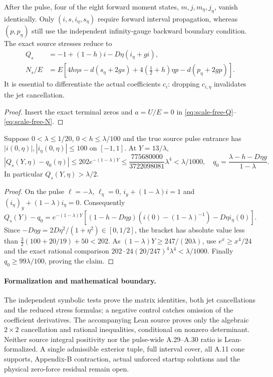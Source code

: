 \begin{corollary}
\label{cor:postpulse-six-state}
After the pulse, four of the eight forward moment states,
$m,j,m_\eta,j_\eta$, vanish identically. Only
$(i,s,i_\eta,s_\eta)$ require forward interval propagation,
whereas $(p,p_\eta)$ still use the independent infinity-gauge
backward boundary condition. The exact source stresses reduce to
\begin{align}
 Q_s&=-1+(1-h)i-D\eta(i_\eta+gi),\label{eq:pulse-end-Q-reduced}\\
 N_s/E&=E[4h\eta s-d(s_\eta+2gs)+
       4(\tfrac12+h)\eta p-d(p_\eta+2gp)].
 \label{eq:pulse-end-N-reduced}
\end{align}
It is essential to differentiate the actual coefficients $c_i$:
dropping $c_{i,\eta}$ invalidates the jet cancellation.
\end{corollary}
\begin{proof}
Insert the exact terminal zeros and $a=U/E=0$
in \eqref{eq:scale-free-Q}--\eqref{eq:scale-free-N}.
\end{proof}

\begin{proposition}
\label{prop:pulse-end-Q-positive}
Suppose $0<\lambda\le1/20$, $0<h\le\lambda/100$ and the
true source pulse entrance has
$|i(0,\eta)|,|i_\eta(0,\eta)|\le100$ on $[-1,1]$.
At $Y=13/\lambda$,
\[
 |Q_s(Y,\eta)-q_0(\eta)|
 \le202e^{-(1-\lambda)Y}
 \le\frac{775680000}{3722098081}\lambda^4
 <\lambda/1000,\quad
 q_0=\frac{\lambda-h-D\eta g}{1-\lambda}.
\]
In particular $Q_s(Y,\eta)>\lambda/2$.
\end{proposition}
\begin{proof}
On the pulse $\ell=-\lambda$, $\ell_\eta=0$,
$i_y+(1-\lambda)i=1$ and
$(i_\eta)_y+(1-\lambda)i_\eta=0$. Consequently
\[
 Q_s(Y)-q_0=e^{-(1-\lambda)Y}
 [(1-h-D\eta g)(i(0)-(1-\lambda)^{-1})
          -D\eta i_\eta(0)].
\]
Since $-D\eta g=2D\eta^2/(1+\eta^2)\in[0,1/2]$,
the bracket has absolute value less than
$\frac32(100+20/19)+50<202$. As
$(1-\lambda)Y\ge247/(20\lambda)$, use
$e^x\ge x^4/24$ and the exact rational comparison
$202\cdot24(20/247)^4\lambda^4<\lambda/1000$.
Finally $q_0\ge99\lambda/100$, proving the claim.
\end{proof}

\paragraph{Formalization and mathematical boundary.}
The independent symbolic tests prove the matrix identities, both
jet cancellations and the reduced stress formulas; a negative
control catches omission of the coefficient derivatives.
The accompanying Lean source proves only the algebraic
$2\times2$ cancellation and rational inequalities, conditional
on nonzero determinant. Neither source integral positivity nor
the pulse-wide A.29--A.30 ratio is Lean-formalized. A single
admissible exterior tuple, full interval cover, all A.11 cone
supports, Appendix-B contraction, actual unforced startup
solutions and the physical zero-force residual remain open.
